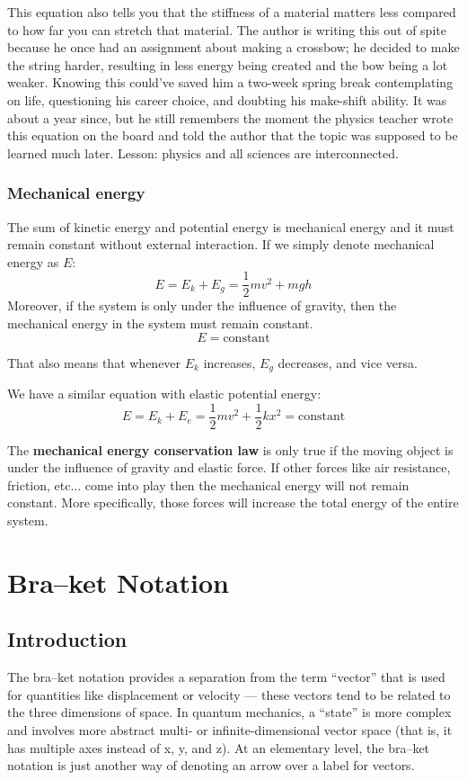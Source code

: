 This equation also tells you that the stiffness of a material matters less compared to how far you can stretch that material. The author is writing this out of spite because he once had an assignment about making a crossbow; he decided to make the string harder, resulting in less energy being created and the bow being a lot weaker. Knowing this could've saved him a two-week spring break contemplating on life, questioning his career choice, and doubting his make-shift ability. It was about a year since, but he still remembers the moment the physics teacher wrote this equation on the board and told the author that the topic was supposed to be learned much later. Lesson: physics and all sciences are interconnected. 

\subsection{Mechanical energy}
The sum of kinetic energy and potential energy is mechanical energy and it must remain constant without external interaction. If we simply denote mechanical energy as $E$:
\begin{equation}
    E
    = E_k + E_g
    = \frac{1}{2}mv^2+mgh
\end{equation}
Moreover, if the system is only under the influence of gravity, then the mechanical energy in the system must remain constant.
\begin{equation} E = \text{constant} \end{equation}

That also means that whenever $E_k$ increases, $E_g$ decreases, and vice versa.  

We have a similar equation with elastic potential energy:
\begin{equation}
    E
    = E_k+E_e
    = \frac{1}{2}mv^2 + \frac{1}{2}kx^2
    = \text{constant}
\end{equation}

The \textbf{mechanical energy conservation law} is only true if the moving object is under the influence of gravity and elastic force. If other forces like air resistance, friction, etc... come into play then the mechanical energy will not remain constant. More specifically, those forces will increase the total energy of the entire system.

\chapter{Bra–ket Notation}
\section{Introduction}
The bra–ket notation provides a separation from the term “vector” that is used for quantities like displacement or velocity — these vectors tend to be related to the three dimensions of space. In quantum mechanics, a “state” is more complex and involves more abstract multi- or infinite-dimensional vector space (that is, it has multiple axes instead of x, y, and z). At an elementary level, the bra–ket notation is just another way of denoting an arrow over a label for vectors. 

